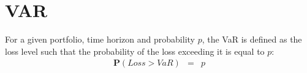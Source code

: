 \chapter{VAR}

For a given portfolio, time horizon and probability $p$, the VaR is defined as the loss level such that the probability of the loss exceeding it is equal to $p$:
\begin{eqnarray}
	\mathbf{P}(Loss > VaR) &=& p
\end{eqnarray}